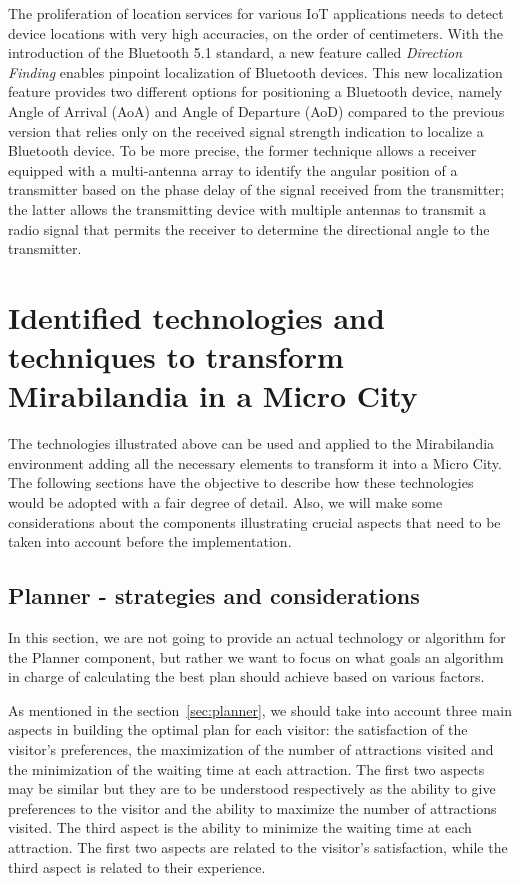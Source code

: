 The proliferation of location services for various IoT applications needs to detect device locations with very high accuracies, on the order of
centimeters. With the introduction of the Bluetooth 5.1 standard, a new feature called \textit{Direction Finding} enables pinpoint localization of
Bluetooth devices. This new localization feature provides two different options for positioning a Bluetooth device, namely Angle of Arrival (AoA) and
Angle of Departure (AoD) compared to the previous version that relies only on the received signal strength indication to localize a Bluetooth device.
To be more precise, the former technique allows a receiver equipped with a multi-antenna array to identify the angular position of a transmitter
based on the phase delay of the signal received from the transmitter; the latter allows the transmitting device with multiple antennas to transmit a
radio signal that permits the receiver to determine the directional angle to the transmitter.

\section{Identified technologies and techniques to transform Mirabilandia in a Micro City}
The technologies illustrated above can be used and applied to the Mirabilandia environment adding all the necessary elements to transform it into a Micro City. The following sections have the objective to describe how these technologies would be adopted with a fair degree of detail.
Also, we will make some considerations about the components illustrating crucial aspects that need to be taken into account before the implementation.

\subsection{Planner - strategies and considerations}
In this section, we are not going to provide an actual technology or algorithm for the Planner component, but rather we want to focus on what goals an
algorithm in charge of calculating the best plan should achieve based on various factors.

As mentioned in the section~\ref{sec:planner}, we should take into account three main aspects in building the optimal plan for each visitor: the
satisfaction of the visitor's preferences, the maximization of the number of attractions visited and the minimization of the waiting time at each
attraction. The first two aspects may be similar but they are to be understood respectively as the ability to give preferences to the visitor and the
ability to maximize the number of attractions visited. The third aspect is the ability to minimize the waiting time at each attraction. The first two
aspects are related to the visitor's satisfaction, while the third aspect is related to their experience.


